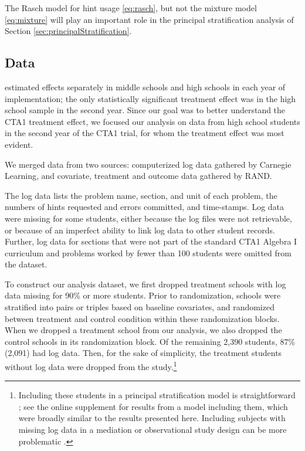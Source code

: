 \documentclass{article}\usepackage[]{graphicx}\usepackage[]{color}
\begin{document}
The Rasch model for hint usage \eqref{eq:rasch}, but not the mixture
model \eqref{eq:mixture} will play an important role in the principal
stratification analysis of Section \ref{sec:principalStratification}.



\subsection{Data}\label{sec:data}

\citep{pane2014effectiveness} estimated effects separately in middle
schools and high schools in each year of implementation; the
only statistically significant treatment effect was in the high school
sample in the second year.
Since our goal was to better understand the CTA1
treatment effect, we focused our analysis on data from high school students in
the second year of the CTA1 trial, for whom the treatment effect was
most evident.

We merged data from two sources: computerized log data gathered by
Carnegie Learning, and covariate, treatment and outcome data gathered by RAND.

The log data lists the problem name, section, and unit of
each problem, the numbers of hints requested and errors committed, and time-stamps.
Log data were missing for some students, either because the log files
were not retrievable, or because of an imperfect ability to link log
data to other student records.
Further, log data for sections that were not part of the
standard CTA1 Algebra I curriculum and problems worked by fewer than 100
students were omitted from the
dataset.

To construct our analysis dataset, we first dropped treatment schools with log data missing
for 90\% or more students.
Prior to randomization, schools were stratified into pairs or triples
based on baseline covariates, and randomized between treatment and
control condition within these randomization blocks.
When we dropped a treatment school from our analysis, we also dropped
the control schools in its randomization block.
Of the remaining 2,390 students, 87\% (2,091) had log
data.
Then, for the sake of simplicity, the treatment students without log data
were dropped from the study.\footnote{Including these students in a
  principal stratification model is straightforward \citep{aoas}; see
  the online supplement for results from a model including them, which
  were broadly similar to the results presented here. Including
  subjects with missing log data in a mediation or observational study
  design can be more problematic \citep[see, e.g.][]{li2017identifiability}.}
\end{document}
